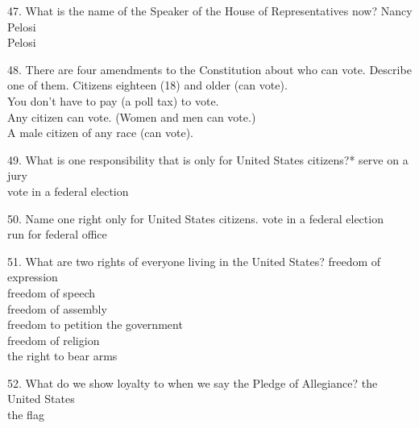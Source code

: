 \documentclass[avery5371,frame]{flashcards}
\begin{document}
        \begin{flashcard}{47. What is the name of the Speaker of the House of Representatives now?}
        {Nancy Pelosi\\Pelosi}
        \end{flashcard}
        \begin{flashcard}{48. There are four amendments to the Constitution about who can vote. Describe one of them.}
        {Citizens eighteen (18) and older (can vote).\\You don’t have to pay (a poll tax) to vote.\\Any citizen can vote. (Women and men can vote.)\\A male citizen of any race (can vote).}
        \end{flashcard}
        \begin{flashcard}{49. What is one responsibility that is only for United States citizens?*}
        {serve on a jury\\vote in a federal election}
        \end{flashcard}
        \begin{flashcard}{50. Name one right only for United States citizens.}
        {vote in a federal election\\run for federal office}
        \end{flashcard}
        \begin{flashcard}{51. What are two rights of everyone living in the United States?}
        {freedom of expression\\freedom of speech\\freedom of assembly\\freedom to petition the government\\freedom of religion\\the right to bear arms}
        \end{flashcard}
        \begin{flashcard}{52. What do we show loyalty to when we say the Pledge of Allegiance?}
        {the United States\\the flag}
        \end{flashcard}
\end{document}
